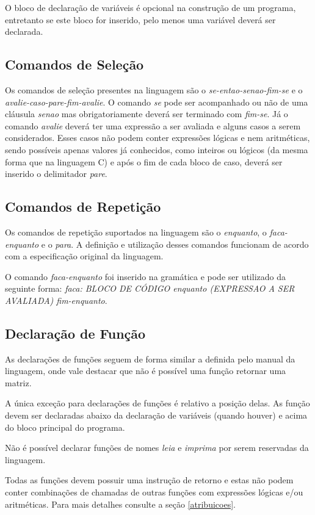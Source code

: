 \documentclass[
12pt,				%
a4paper,			%
english,			%
french,				%
spanish,			%
brazil,				%
article
]{abntex2}
\begin{document}
O bloco de declaração de variáveis é opcional na construção de um programa, entretanto se este bloco for inserido, pelo menos uma variável deverá ser declarada.


\subsection{Comandos de Seleção}
Os comandos de seleção presentes na linguagem são o \textit{se-entao-senao-fim-se} e o \textit{avalie-caso-pare-fim-avalie}.
O comando \textit{se} pode ser acompanhado ou não de uma cláusula \textit{senao} mas obrigatoriamente deverá ser terminado com \textit{fim-se}. Já o comando \textit{avalie} deverá ter uma expressão a ser avaliada e alguns casos a serem considerados. Esses casos não podem conter expressões lógicas e nem aritméticas, sendo possíveis apenas valores já conhecidos, como inteiros ou lógicos (da mesma forma que na linguagem C) e após o fim de cada bloco de caso, deverá ser inserido o delimitador \textit{pare}.

\subsection{Comandos de Repetição}
Os comandos de repetição suportados na linguagem são o \textit{enquanto}, o \textit{faca-enquanto} e o \textit{para}. A definição e utilização desses comandos funcionam de acordo com a especificação original da linguagem.

O comando \textit{faca-enquanto} foi inserido na gramática e pode ser utilizado da seguinte forma:
\textit{faca: BLOCO DE CÓDIGO enquanto (EXPRESSAO A SER AVALIADA) fim-enquanto}.

\subsection{Declaração de Função}
As declarações de funções seguem de forma similar a definida pelo manual da linguagem, onde vale destacar que não é possível uma função retornar uma matriz.

A única exceção para declarações de funções é relativo a posição delas. As função devem ser declaradas abaixo da declaração de variáveis (quando houver) e acima do bloco principal do programa.

Não é possível declarar funções de nomes \textit{leia} e \textit{imprima} por serem reservadas da linguagem.

Todas as funções devem possuir uma instrução de retorno e estas não podem conter combinações de chamadas de outras funções com expressões lógicas e/ou aritméticas. Para mais detalhes consulte a seção \ref{atribuicoes}.
\end{document}
